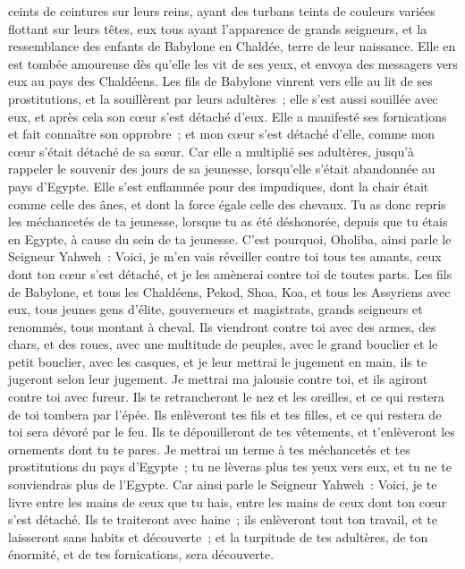 \begin{multicols}{2}
ceints de ceintures sur leurs reins, ayant des turbans teints de couleurs variées flottant sur leurs têtes, eux tous ayant l'apparence de grands seigneurs, et la ressemblance des enfants de Babylone en Chaldée, terre de leur naissance.
Elle en est tombée amoureuse dès qu'elle les vit de ses yeux, et envoya des messagers vers eux au pays des Chaldéens. 
Les fils de Babylone vinrent vers elle au lit de ses prostitutions, et la souillèrent par leurs adultères~; elle s'est aussi souillée avec eux, et après cela son cœur s'est détaché d'eux.
Elle a manifesté ses fornications et fait connaître son opprobre~; et mon cœur s'est détaché d'elle, comme mon cœur s'était détaché de sa sœur.
Car elle a multiplié ses adultères, jusqu'à rappeler le souvenir des jours de sa jeunesse, lorsqu'elle s'était abandonnée au pays d'Egypte.
Elle s'est enflammée pour des impudiques, dont la chair était comme celle des ânes, et dont la force égale celle des chevaux.
Tu as donc repris les méchancetés de ta jeunesse, lorsque tu as été déshonorée, depuis que tu étais en Egypte, à cause du sein de ta jeunesse.
C'est pourquoi, Oholiba, ainsi parle le Seigneur Yahweh~: Voici, je m'en vais réveiller contre toi tous tes amants, ceux dont ton cœur s'est détaché, et je les amènerai contre toi de toutes parts.
Les fils de Babylone, et tous les Chaldéens, Pekod, Shoa, Koa, et tous les Assyriens avec eux, tous jeunes gens d'élite, gouverneurs et magistrats, grands seigneurs et renommés, tous montant à cheval.
Ils viendront contre toi avec des armes, des chars, et des roues, avec une multitude de peuples, avec le grand bouclier et le petit bouclier, avec les casques, et je leur mettrai le jugement en main, ils te jugeront selon leur jugement.
Je mettrai ma jalousie contre toi, et ils agiront contre toi avec fureur. Ils te retrancheront le nez et les oreilles, et ce qui restera de toi tombera par l'épée. Ils enlèveront tes fils et tes filles, et ce qui restera de toi sera dévoré par le feu.
Ils te dépouilleront de tes vêtements, et t'enlèveront les ornements dont tu te pares.
Je mettrai un terme à tes méchancetés et tes prostitutions du pays d'Egypte~; tu ne lèveras plus tes yeux vers eux, et tu ne te souviendras plus de l'Egypte.
Car ainsi parle le Seigneur Yahweh~: Voici, je te livre entre les mains de ceux que tu hais, entre les mains de ceux dont ton cœur s'est détaché.
Ils te traiteront avec haine~; ils enlèveront tout ton travail, et te laisseront sans habits et découverte~; et la turpitude de tes adultères, de ton énormité, et de tes fornications, sera découverte.

\end{multicols}
